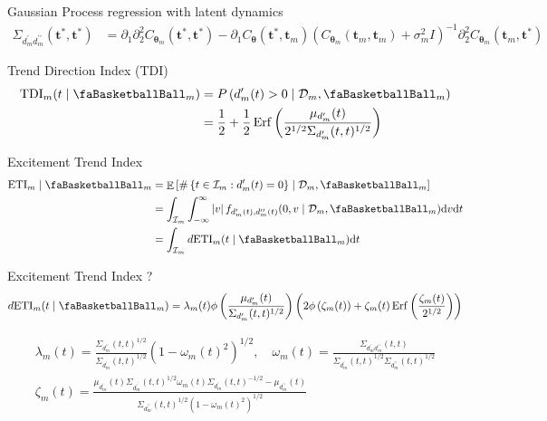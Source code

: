 \documentclass[ignorenonframetext,xcolor=pdflatex,table,dvipsnames,serif]{beamer}
\newcommand{\BTheta}{\text{\faBasketballBall}}
\DeclareMathOperator{\E}{\mathbb{E}}
\DeclareMathOperator{\Erf}{Erf}
\begin{document}
\begin{frame}{Gaussian Process regression with latent dynamics}
{\begin{align*}
  \Sigma_{d_m^\prime d_m^{\prime\prime}}(\mathbf{t}^\ast, \mathbf{t}^\ast) &= \partial_1 \partial_2^2 C_{\bm{\theta}_m}(\mathbf{t}^\ast, \mathbf{t}^\ast) - \partial_1 C_{\bm{\theta}}(\mathbf{t}^\ast, \mathbf{t}_m)\left(C_{\bm{\theta}_m}(\mathbf{t}_m, \mathbf{t}_m) + \sigma^2_m I\right)^{-1} \partial_2^2 C_{\bm{\theta}_m}(\mathbf{t}_m, \mathbf{t}^\ast)
\end{align*}
}
\end{frame}


\begin{frame}{Trend Direction Index (TDI)}
\begin{align*}
\begin{split}
  \textrm{TDI}_m(t \mid \BTheta_m) &= P\left(d_m^\prime(t) > 0 \mid \mathcal{D}_m, \BTheta_m\right)\\
     &= \frac{1}{2} + \frac{1}{2}\Erf\left(\frac{\mu_{d_m^\prime}(t)}{2^{1/2}\Sigma_{d_m^\prime}(t, t)^{1/2}}\right)
\end{split}
\end{align*}	
\end{frame}

\begin{frame}{Excitement Trend Index}
\begin{align*}
\begin{split}
  \text{ETI}_m \mid \BTheta_m &= \E\left[\#\left\{t \in \mathcal{I}_m : d^\prime_m(t) = 0\right\} \mid \mathcal{D}_m, \BTheta_m\right]\\
  &= \int_{\mathcal{I}_m} \int_{-\infty}^\infty \left|v\right| f_{d^\prime_m(t), d^{\prime\prime}_m(t)}(0, v \mid \mathcal{D}_m, \BTheta_m)\textrm{d}v\textrm{d}t \\
  &= \int_{\mathcal{I}_m} d\mathrm{ETI}_m(t \mid \BTheta_m)\mathrm{d}t
\end{split}
\end{align*}	
\end{frame}


\begin{frame}{Excitement Trend Index}
?
{
\small
\begin{align*}
d\mathrm{ETI}_m(t \mid \BTheta_m) = \lambda_m(t)\phi\left(\frac{\mu_{d_m^\prime}(t)}{\Sigma_{d_m^\prime}(t,t)^{1/2}}\right)\left(2\phi\left(\zeta_m(t)\right) + \zeta_m(t)\Erf\left(\frac{\zeta_m(t)}{2^{1/2}}\right)\right)
\end{align*}
}

{
\small
\begin{gather*}
  \lambda_m(t) = \frac{\Sigma_{d_m^{\prime\prime}}(t,t)^{1/2}}{\Sigma_{d_m^\prime}(t,t)^{1/2}}\left(1-\omega_m(t)^2\right)^{1/2}, \quad \omega_m(t) = \frac{\Sigma_{d_m^\prime d_m^{\prime\prime}}(t,t)}{\Sigma_{d_m^\prime}(t,t)^{1/2}\Sigma_{d_m^{\prime\prime}}(t,t)^{1/2}}\\
  \zeta_m(t) = \frac{\mu_{d_m^\prime}(t)\Sigma_{d_m^{\prime^\prime}}(t,t)^{1/2}\omega_m(t)\Sigma_{d_m^\prime}(t,t)^{-1/2} - \mu_{d_m^{\prime\prime}}(t)}{\Sigma_{d_m^{\prime\prime}}(t,t)^{1/2}\left(1 - \omega_m(t)^2\right)^{1/2}}
\end{gather*}
}
\end{frame}
\end{document}
